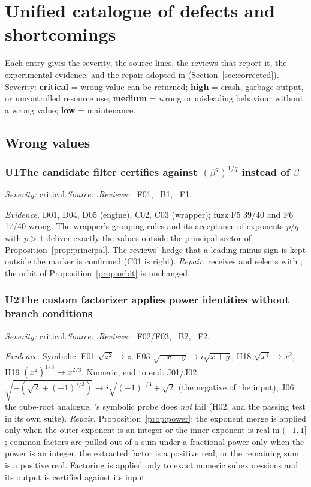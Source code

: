 \section{Unified catalogue of defects and shortcomings}
\label{sec:findings}
Each entry gives the severity, the source lines, the reviews that report it,
the experimental evidence, and the repair adopted in 
(Section~\ref{sec:corrected}). Severity: \textbf{critical} = wrong value can
be returned; \textbf{high} = crash, garbage output, or uncontrolled resource
use; \textbf{medium} = wrong or misleading behaviour without a wrong value;
\textbf{low} = maintenance.

\newcommand{\finding}[6]{\subsubsection*{#1\quad #2}\label{u:#3}\noindent\textit{Severity:} #4.\quad\textit{Source:} #5.\quad\textit{Reviews:} #6.\par}

\subsection{Wrong values}

\finding{U1}{The candidate filter certifies against $(\beta^q)^{1/q}$ instead of $\beta$}{1}{critical}{\src{94, 125--127}}{\RI\ F01, \RII\ B1, \RIII\ F1}
\emph{Evidence.} D01, D04, D05 (engine), C02, C03 (wrapper); fuzz F5 39/40
and F6 17/40 wrong. The wrapper's grouping rules and its acceptance of
exponents $p/q$ with $p>1$ deliver exactly the values outside the principal
sector of Proposition~\ref{prop:principal}. The reviews' hedge that a leading
minus sign is kept outside the marker is confirmed (C01 is right).
\emph{Repair.}  receives  and selects with
; the orbit of Proposition~\ref{prop:orbit}
is unchanged.

\finding{U2}{The custom factorizer applies power identities without branch conditions}{2}{critical}{\src{527--531, 571--583}}{\RI\ F02/F03, \RII\ B2, \RIII\ F2}
\emph{Evidence.} Symbolic: E01 $\sqrt{z^2}\to z$, E03 $\sqrt{-x-y}\to i\sqrt{x+y}$,
H18 $\sqrt{x^4}\to x^2$, H19 $(x^2)^{1/3}\to x^{2/3}$. Numeric, end to end:
J01/J02 $\sqrt{-(\sqrt2+(-1)^{1/3})}\to i\sqrt{(-1)^{1/3}+\sqrt2}$ (the negative of
the input), J06 the cube-root analogue. \RI's symbolic probe
 does \emph{not} fail (H02, and the passing test in its
own suite). \emph{Repair.} Proposition~\ref{prop:power}: the exponent merge is
applied only when the outer exponent is an integer or the inner exponent is
real in $(-1,1]$; common factors are pulled out of a sum under a fractional
power only when the power is an integer, the extracted factor is a positive
real, or the remaining sum is a positive real. Factoring is applied only to
exact numeric subexpressions and its output is certified against its input.

